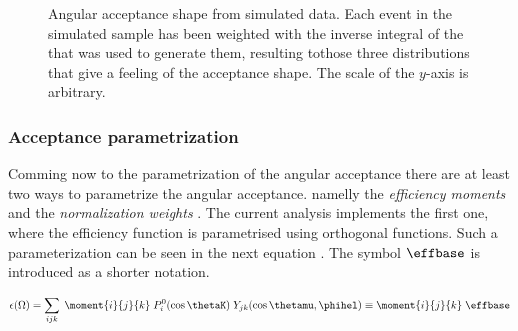 \begin{figure}[h]
  \centering
  \begin{subfigure}{0.49\textwidth}
    \scalebox{1.3}{}
    \caption{}
    \label{angAcc_ctk}
  \end{subfigure}%
  \hfill%
  \begin{subfigure}{0.49\textwidth}
    \scalebox{1.3}{}
    \caption{}
    \label{angAcc_ctl}
  \end{subfigure}

  \vspace*{0.02\textwidth}
  \begin{subfigure}{0.49\textwidth}
    \scalebox{1.3}{}
    \caption{}
    \label{angAcc_phi}
  \end{subfigure}
  \caption{Angular acceptance shape from simulated data. Each event in the simulated sample has been weighted with the inverse integral 
           of the \pdf that was used to generate them, resulting tothose three distributions that give a feeling of the acceptance shape.
           The scale of the $y$-axis is arbitrary.}
\end{figure}

\subsubsection{Acceptance parametrization}
Comming now to the parametrization of the angular acceptance there are at least two ways to parametrize the angular acceptance.
namelly the \emph{efficiency moments} \cite{jeroenThesis} and the \emph{normalization weights} \cite{tristanThesis,jeroenThesis}. 
The current analysis implements the first one, where the efficiency function is parametrised using orthogonal functions. Such a 
parameterization can be seen in the next equation . The symbol $\effbase$ is introduced as a shorter notation.

\begin{center}
\begin{equation}
  \epsilon(\Omega) = \sum_{ijk} \; \moment{i}{j}{k} \; P_i^0(\cos\thetaK) \; Y_{jk}(\cos\thetamu,\phihel) \equiv \moment{i}{j}{k} \; \effbase
  \label{eff_func}
\end{equation}
\end{center}

